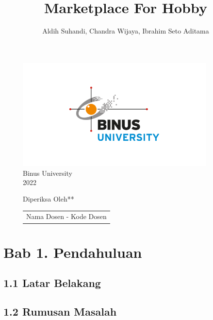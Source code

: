 \documentclass[a4paper]{article}
\begin{document}
\linespread{1.5}

\title{Marketplace For Hobby}
\author{Aldih Suhandi, Chandra Wijaya, Ibrahim Seto Aditama}

\maketitle
\begin{figure}[h]
    \centering
    \includegraphics[width=10cm]{logo_binus.png}\\
    Binus University\\
    2022
\end{figure}
\begin{figure}[h]
    \centering
    Diperiksa Oleh**\\
    \vspace{15mm}
    \begin{tabular}{@{}p{2.5in}@{}}
    \centering
    Nama Dosen - Kode Dosen
    \end{tabular}
\end{figure}

\newpage
{}
\tableofcontents

\newpage
\section*{Bab 1. Pendahuluan}

\subsection*{1.1 Latar Belakang}

\subsection*{1.2 Rumusan Masalah}
\end{document}
